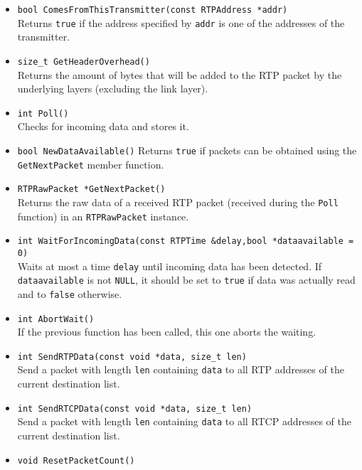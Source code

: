 \documentclass[12pt,a4paper]{article}
\begin{document}
\begin{itemize}
						{\tt buffer} is not NULL-terminated. If the function fails because
						the buffer isn't large enough, it returns {\tt ERR\_RTP\_TRANS\_BUFFERLENGTHTOOSMALL}
						and stores the number of bytes needed in {\tt bufferlength}.
					\item {\tt bool ComesFromThisTransmitter(const RTPAddress *addr)}\\
						Returns {\tt true} if the address specified by {\tt addr} is one
						of the addresses of the transmitter. 
					\item {\tt size\_t GetHeaderOverhead()}\\
						Returns the amount of bytes that will be added to the RTP packet
						by the underlying layers (excluding the link layer).
					\item {\tt int Poll()}\\
						Checks for incoming data and stores it.
					\item {\tt bool NewDataAvailable()}
						Returns {\tt true} if packets can be obtained using the
						{\tt GetNextPacket} member function.
					\item {\tt RTPRawPacket *GetNextPacket()}\\
						Returns the raw data of a received RTP packet (received during
						the {\tt Poll} function) in an {\tt RTPRawPacket} instance.
					\item {\tt int WaitForIncomingData(const RTPTime \&delay,bool *dataavailable = 0)}\\
						Waits at most a time {\tt delay} until incoming data has
						been detected. If {\tt dataavailable} is not {\tt NULL}, it should
						be set to {\tt true} if data was actually read and to {\tt false}
						otherwise.
					\item {\tt int AbortWait()}\\
						If the previous function has been called, this one aborts
						the waiting.
					\item {\tt int SendRTPData(const void *data, size\_t len)}\\
						Send a packet with length {\tt len} containing {\tt data}
						to all RTP addresses of the current destination list.
					\item {\tt int SendRTCPData(const void *data, size\_t len)}\\
						Send a packet with length {\tt len} containing {\tt data}
						to all RTCP addresses of the current destination list.
					\item {\tt void ResetPacketCount()}\\

\end{itemize}
\end{document}

